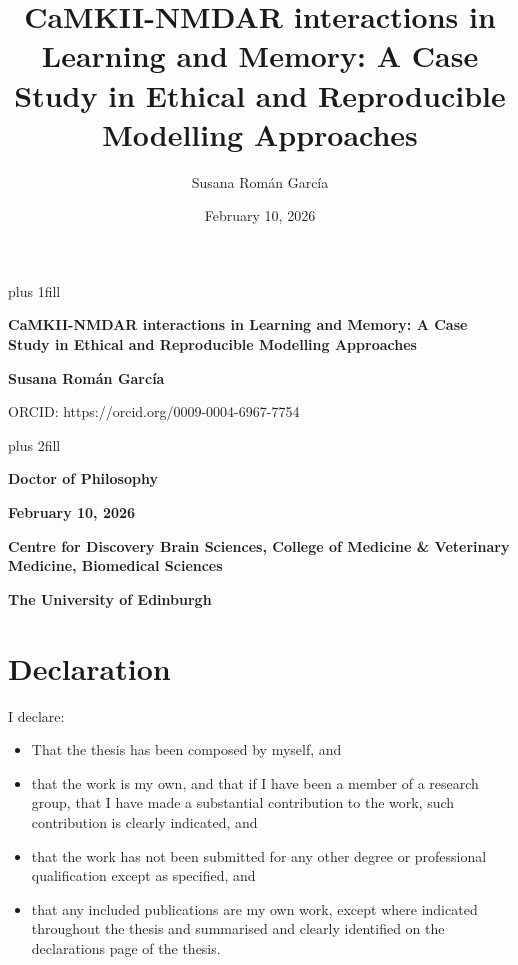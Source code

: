 \documentclass[
  11pt,
  letterpaper,
]{scrreprt}
\title{CaMKII-NMDAR interactions in Learning and Memory: A Case Study in
Ethical and Reproducible Modelling Approaches}
\author{Susana Román García}
\date{February 10, 2026}
\begin{document}
\cleardoublepage
\thispagestyle{empty}
{\centering
\hbox{}\vskip 0cm plus 1fill
{\Huge\bfseries CaMKII-NMDAR interactions in Learning and Memory: A Case
Study in Ethical and Reproducible Modelling Approaches \par}
\vspace{12ex}
{\Large\bfseries Susana Román García \par}
\vspace{3ex}
{\Large ORCID: https://orcid.org/0009-0004-6967-7754 \par}
\vskip 0cm plus 2fill
{\bfseries\large Doctor of Philosophy \par}
\vspace{3ex}
{\bfseries\large February 10, 2026 \par}
\vspace{12ex}
%
%
{\bfseries\large Centre for Discovery Brain Sciences, College of
Medicine \& Veterinary Medicine, Biomedical Sciences \par}
\vspace{3ex}
%
{\bfseries\large The University of Edinburgh \par}
%
\vspace{12ex}
{\small  \par}
}



\chapter*{Declaration}\label{declaration}


I declare:

\begin{itemize}
\item
  That the thesis has been composed by myself, and
\item
  that the work is my own, and that if I have been a member of a
  research group, that I have made a substantial contribution to the
  work, such contribution is clearly indicated, and
\item
  that the work has not been submitted for any other degree or
  professional qualification except as specified, and
\item
  that any included publications are my own work, except where indicated
  throughout the thesis and summarised and clearly identified on the
  declarations page of the thesis.
\end{itemize}
\end{document}
